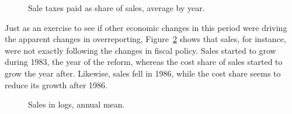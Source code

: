 \documentclass[
  12pt]{article}
\theoremstyle{definition}
\theoremstyle{remark}
\begin{document}
\begin{figure}


\caption{\label{fig-vat}Sale taxes paid as share of sales, average by
year.}

\end{figure}%

Just as an exercise to see if other economic changes in this period were
driving the apparent changes in overreporting, Figure~\ref{fig-logsales}
shows that sales, for instance, were not exactly following the changes
in fiscal policy. Sales started to grow during 1983, the year of the
reform, whereas the cost share of sales started to grow the year after.
Likewise, sales fell in 1986, while the cost share seems to reduce its
growth after 1986.

\begin{figure}


\caption{\label{fig-logsales}Sales in logs, annual mean.}

\end{figure}%
\end{document}
